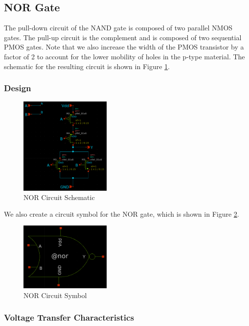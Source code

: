 \documentclass[fleqn]{article}
\begin{document}
	\subsection{NOR Gate}
	
	The pull-down circuit of the NAND gate is composed of two parallel NMOS gates. The pull-up circuit is the complement and is composed of two sequential PMOS gates. Note that we also increase the width of the PMOS transistor by a factor of 2 to account for the lower mobility of holes in the p-type material. The schematic for the resulting circuit is shown in Figure \ref{fig::nor_schematic}.
	
	\subsubsection{Design}
	
	\begin{figure}[H]
		\centerline{\includegraphics[width=0.4\textwidth]{nor_schematic.png}}
		\caption{NOR Circuit Schematic}
		\label{fig::nor_schematic}
	\end{figure}
	
	We also create a circuit symbol for the NOR gate, which is shown in Figure \ref{fig::nor_symbol}.
	
	\begin{figure}[H]
		\centerline{\includegraphics[width=0.4\textwidth]{nor_symbol.png}}
		\caption{NOR Circuit Symbol}
		\label{fig::nor_symbol}
	\end{figure}

	\subsubsection{Voltage Transfer Characteristics}
	
\end{document}
